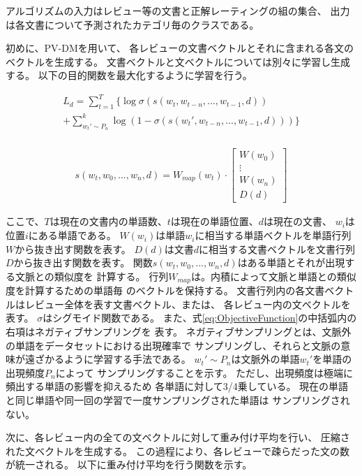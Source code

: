 \documentclass[twocolumn,a4paper]{ltjarticle}
\begin{document}
アルゴリズムの入力はレビュー等の文書と正解レーティングの組の集合、
出力は各文書について予測されたカテゴリ毎のクラスである。

初めに、PV-DMを用いて、
各レビューの文書ベクトルとそれに含まれる各文のベクトルを生成する。
文書ベクトルと文ベクトルについては別々に学習し生成する。
以下の目的関数を最大化するように学習を行う。

\begin{multline}
  L_d = \sum^{T}_{t = 1} \{ \log \sigma(s(w_t, w_{t-n}, ..., w_{t-1}, d)) \\
        + \sum^{k}_{w_{t}' \sim P_n}
          \log(1 - \sigma(s(w_{t}', w_{t-n}, ..., w_{t-1}, d))) \}
  \label{eq:ObjectiveFunction} \\
\end{multline}

\begin{gather}
  s(w_t, w_0, ..., w_n, d)
    = W_{map}(w_t)
      \cdot \begin{bmatrix} W(w_0) \\ \vdots \\ W(w_n) \\ D(d) \end{bmatrix}
\end{gather}

ここで、$T$は現在の文書内の単語数、$t$は現在の単語位置、$d$は現在の文書、
$w_i$は位置$i$にある単語である。
$W(w_i)$は単語$w_i$に相当する単語ベクトルを単語行列$W$から抜き出す関数を表す。
$D(d)$は文書$d$に相当する文書ベクトルを文書行列$D$から抜き出す関数を表す。
関数$s(w_t, w_0, ..., w_n, d)$はある単語とそれが出現する文脈との類似度を
計算する。
行列$W_{map}$は。内積によって文脈と単語との類似度を計算するための単語毎
のベクトルを保持する。
文書行列内の各文書ベクトルはレビュー全体を表す文書ベクトル、または、
各レビュー内の文ベクトルを表す。
$\sigma$はシグモイド関数である。
また、式\ref{eq:ObjectiveFunction}の中括弧内の右項はネガティブサンプリングを
表す。
ネガティブサンプリングとは、文脈外の単語をデータセットにおける出現確率で
サンプリングし、それらと文脈の意味が遠ざかるように学習する手法である。
$w_{t}' \sim P_n$は文脈外の単語$w_{t}'$を単語の出現頻度$P_n$によって
サンプリングすることを示す。
ただし、出現頻度は極端に頻出する単語の影響を抑えるため
各単語に対して3/4乗している。
現在の単語と同じ単語や同一回の学習で一度サンプリングされた単語は
サンプリングされない。

次に、各レビュー内の全ての文ベクトルに対して重み付け平均を行い、
圧縮された文ベクトルを生成する。
この過程により、各レビューで疎らだった文の数が統一される。
以下に重み付け平均を行う関数を示す。
\end{document}
